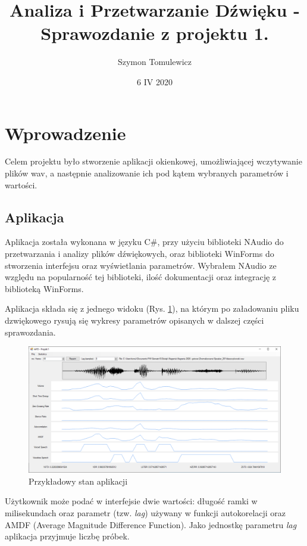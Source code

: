 \documentclass[12pt,a4paper]{article}
\begin{document}
\title{Analiza i Przetwarzanie Dźwięku - Sprawozdanie z projektu 1.}
\author{Szymon Tomulewicz}
\date{6 IV 2020}
\maketitle
\tableofcontents
\newpage

\section{Wprowadzenie\label{sec:wprowadzenie}}
Celem projektu było stworzenie aplikacji okienkowej, umożliwiającej wczytywanie plików wav,
a następnie analizowanie ich pod kątem wybranych parametrów i wartości.

\subsection{Aplikacja\label{sec:aplikacja}}
Aplikacja została wykonana w języku C\#, przy użyciu biblioteki NAudio do przetwarzania i analizy plików dźwiękowych, oraz biblioteki WinForms do stworzenia interfejsu oraz wyświetlania parametrów. Wybrałem NAudio ze względu na popularność tej biblioteki, ilość dokumentacji oraz integrację z biblioteką WinForms.

Aplikacja składa się z jednego widoku (Rys. \ref{fig:app_preview}), na którym po załadowaniu pliku dzwiękowego rysują się wykresy parametrów opisanych w dalszej części sprawozdania.

\begin{figure}[h!]
\centering
\includegraphics[width=1.0\textwidth]{figures/app_preview}
\caption{Przykładowy stan aplikacji}
\label{fig:app_preview}
\end{figure}

Użytkownik może podać w interfejsie dwie wartości: długość ramki w milisekundach oraz parametr (tzw. \emph{lag}) używany w funkcji autokorelacji oraz AMDF (Average Magnitude Difference Function). Jako jednostkę parametru \emph{lag} aplikacja przyjmuje liczbę próbek.
\end{document}
